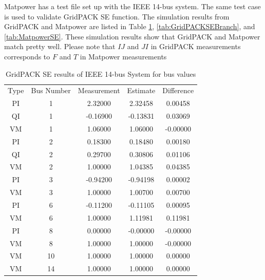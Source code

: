 \documentclass[a4paper]{article}
\begin{document}
Matpower has a test file set up with the IEEE 14-bus system. The same test case is used to validate GridPACK SE function. The simulation results from GridPACK and Matpower are listed in Table \ref{tab:GridPACKSEBus}, \ref{tab:GridPACKSEBranch}, and \ref{tab:MatpowerSE}. These simulation results show that GridPACK and Matpower match pretty well. Please note that $IJ$ and $JI$ in GridPACK measurements corresponds to $F$ and $T$ in Matpower measurements

\begin{table} [ht]
\centering
\begin{tabular} {c|c|c|c|c}
	\hline
  Type  &  Bus Number &    Measurement &         Estimate &        Difference \\
     PI  &      1     &        2.32000 &          2.32458 &           0.00458 \\
     QI  &      1     &       -0.16900 &         -0.13831 &           0.03069 \\
     VM  &      1     &        1.06000 &          1.06000 &          -0.00000 \\
     PI  &      2     &        0.18300 &          0.18480 &           0.00180 \\
     QI  &      2     &        0.29700 &          0.30806 &           0.01106 \\
     VM  &      2     &        1.00000 &          1.04385 &           0.04385 \\   
     PI  &      3     &       -0.94200 &         -0.94198 &           0.00002 \\     
     VM  &      3     &        1.00000 &          1.00700 &           0.00700 \\     
     PI  &      6     &       -0.11200 &         -0.11105 &           0.00095 \\     
     VM  &      6     &        1.00000 &          1.11981 &           0.11981 \\     
     PI  &      8     &        0.00000 &         -0.00000 &          -0.00000 \\     
     VM  &      8     &        1.00000 &          1.00000 &          -0.00000 \\     
     VM  &     10     &        1.00000 &          1.00000 &           0.00000 \\     
     VM  &     14     &        1.00000 &          1.00000 &           0.00000 \\
     \hline
\end{tabular}
\caption{GridPACK SE results of IEEE 14-bus System for bus values} \label{tab:GridPACKSEBus} 
\end{table}
\end{document}
